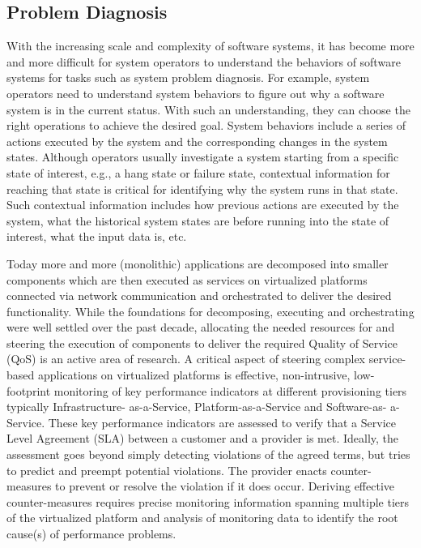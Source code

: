  



\subsection{Problem Diagnosis}
With the increasing scale and complexity of software
systems, it has become more and more difficult for system operators to understand the behaviors of software systems for tasks such as system problem diagnosis. For example, system operators need to understand system behaviors to figure out why a software system is in the current status. With such an understanding, they can choose the right operations to achieve the desired goal. System behaviors include a series of actions executed by the system and the corresponding changes in the system states. Although operators usually investigate a system starting from a specific state of interest, e.g., a hang state or failure state, contextual information for reaching that state is critical for identifying why the system runs in that state. Such contextual information includes how previous actions are executed by the system, what the historical system states are before running into the state of interest, what the input data is, etc.


Today more and more (monolithic) applications are decomposed into smaller components which are then executed as services on virtualized platforms connected via network communication and orchestrated to deliver the desired functionality. While the foundations for decomposing, executing and orchestrating were well settled over the past decade, allocating the needed resources for and steering the execution of components to deliver the required Quality of Service (QoS) is an active area of research. A critical aspect of steering complex service-based applications on virtualized platforms is effective, non-intrusive, low-footprint monitoring of key performance indicators at different provisioning tiers typically Infrastructure- as-a-Service, Platform-as-a-Service and Software-as- a-Service. These key performance indicators are assessed to verify that a Service Level Agreement (SLA) between a customer and a provider is met. Ideally, the assessment goes beyond simply detecting violations of the agreed terms, but tries to predict and preempt potential violations. The provider enacts counter-measures to prevent or resolve the violation if it does occur. Deriving effective counter-measures requires precise monitoring information spanning multiple tiers of the virtualized platform and analysis of monitoring data to identify the root cause(s) of performance problems.


